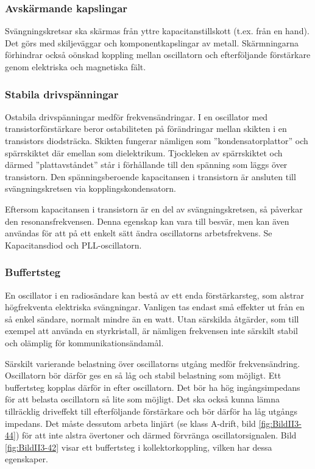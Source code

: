 \subsubsection{Avskärmande kapslingar}

Svängningskretsar ska skärmas från yttre kapacitanstillskott
(t.ex. från en hand).
Det görs med skiljeväggar och komponentkapslingar av metall.
Skärmningarna förhindrar också oönskad koppling mellan oscillatorn och
efterföljande förstärkare genom elektriska och magnetiska fält.

\subsubsection{Stabila drivspänningar}

Ostabila drivspänningar medför frekvensändringar.
I en oscillator med transistorförstärkare beror ostabiliteten på förändringar
mellan skikten i en transistors diodsträcka.
Skikten fungerar nämligen som ''kondensatorplattor'' och spärrskiktet där
emellan som dielektrikum.
Tjockleken av spärrskiktet och därmed ''plattavståndet'' står i förhållande
till den spänning som läggs över transistorn.
Den spänningsberoende kapacitansen i transistorn är ansluten till
svängningskretsen via kopplingskondensatorn.

Eftersom kapacitansen i transistorn är en del av svängningskretsen, så påverkar
den resonansfrekvensen.
Denna egenskap kan vara till besvär, men kan även användas för att på ett
enkelt sätt ändra oscillatorns arbetsfrekvens.
Se Kapacitansdiod och PLL-oscillatorn.

\subsubsection{Buffertsteg}

En oscillator i en radiosändare kan bestå av ett enda förstärkarsteg,
som alstrar högfrekventa elektriska svängningar.
Vanligen tas endast små effekter ut från en så enkel sändare, normalt mindre än
en watt.
Utan särskilda åtgärder, som till exempel att använda en styrkristall, är nämligen
frekvensen inte särskilt stabil och olämplig för kommunikationsändamål.

Särskilt varierande belastning över oscillatorns utgång medför frekvensändring.
Oscillatorn bör därför ges en så låg och stabil belastning som möjligt.
Ett buffertsteg kopplas därför in efter oscillatorn.
Det bör ha hög ingångsimpedans för att belasta oscillatorn så lite som möjligt.
Det ska också kunna lämna tillräcklig driveffekt till efterföljande förstärkare
och bör därför ha låg utgångs impedans.
Det måste dessutom arbeta linjärt (se klass A-drift, bild \ref{fig:BildII3-44})
för att inte alstra övertoner och därmed förvränga oscillatorsignalen.
Bild \ref{fig:BildII3-42} visar ett buffertsteg i kollektorkoppling, vilken har
dessa egenskaper.

